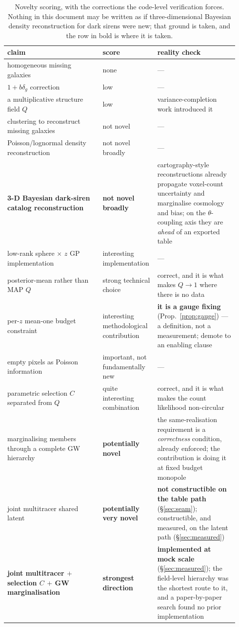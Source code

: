 \documentclass[11pt]{article}
\theoremstyle{definition}
\theoremstyle{remark}
\begin{document}
\begin{table}[h]
\centering\small
\begin{tabular}{p{0.40\linewidth}p{0.20\linewidth}p{0.34\linewidth}}
\toprule
claim & score & reality check \\
\midrule
homogeneous missing galaxies & none & --- \\
$1+b\delta_g$ correction & low & --- \\
a multiplicative structure field $Q$ & low & variance-completion work introduced it \\
clustering to reconstruct missing galaxies & not novel & --- \\
Poisson/lognormal density reconstruction & not novel broadly & --- \\
\textbf{3-D Bayesian dark-siren catalog reconstruction} & \textbf{not novel broadly} & cartography-style reconstructions already propagate voxel-count uncertainty and marginalise cosmology and bias; on the $\theta$-coupling axis they are \emph{ahead} of an exported table \\
low-rank sphere$\,\times\,z$ GP implementation & interesting implementation & --- \\
posterior-mean rather than MAP $Q$ & strong technical choice & correct, and it is what makes $Q\to1$ where there is no data \\
per-$z$ mean-one budget constraint & interesting methodological contribution & \textbf{it is a gauge fixing} (Prop.~\ref{prop:gauge}) --- a definition, not a measurement; demote to an enabling clause \\
empty pixels as Poisson information & important, not fundamentally new & --- \\
parametric selection $C$ separated from $Q$ & quite interesting combination & correct, and it is what makes the count likelihood non-circular \\
marginalising members through a complete GW hierarchy & \textbf{potentially novel} & the same-realisation requirement is a \emph{correctness} condition, already enforced; the contribution is doing it at fixed budget monopole \\
joint multitracer shared latent & \textbf{potentially very novel} & \textbf{not constructible on the table path} (\S\ref{sec:seam}); constructible, and measured, on the latent path (\S\ref{sec:measured}) \\
\textbf{joint multitracer $+$ selection $C$ $+$ GW marginalisation} & \textbf{strongest direction} & \textbf{implemented at mock scale} (\S\ref{sec:measured}); the field-level hierarchy was the shortest route to it, and a paper-by-paper search found no prior implementation \\
\bottomrule
\end{tabular}
\caption{Novelty scoring, with the corrections the code-level verification forces.
Nothing in this document may be written as if three-dimensional Bayesian
density reconstruction for dark sirens were new; that ground is taken, and the
row in bold is where it is taken.}
\end{table}
\end{document}
